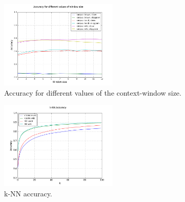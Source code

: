 \documentclass[conference]{IEEEtran}
\begin{document}
\begin{figure}[t]
\centering
\includegraphics[width=0.5\textwidth]{graph_acc_window}
\caption{Accuracy for different values of the context-window size. }
\label{fig:window}
\end{figure}

\begin{figure}[t]
\centering
\includegraphics[width=0.5\textwidth]{graph_knn-acc}
\caption{k-NN accuracy. }
\label{fig:knn}
\end{figure}

\label{sec:res}


%
%
\end{document}

